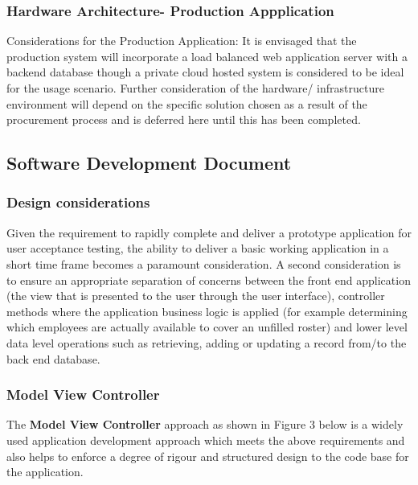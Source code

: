 \documentclass[a4paper,Times New Roman 11pt]{article}
\begin{document}
\subsubsection{Hardware Architecture- Production Appplication}

Considerations for the Production Application: It is envisaged that the production system will incorporate a load balanced web application server with a backend database though a private cloud hosted system is considered to be ideal for the usage scenario. Further consideration of the hardware/ infrastructure environment will depend on the specific solution chosen as a result of the procurement process and is deferred here until this has been completed.

\subsection {Software Development Document}
\subsubsection{Design considerations}
Given the requirement to rapidly complete and deliver a prototype application for user acceptance testing, the ability to deliver a basic working application in a short time frame becomes a paramount consideration. A second consideration is to ensure an appropriate separation of concerns between the front end application (the view that is presented to the user through the user interface), controller methods where the application business logic is applied (for example determining which employees are actually available to cover an unfilled roster) and lower level data level operations such as retrieving, adding or updating a record from/to the back end database.
\subsubsection{Model View Controller}

The \textbf{Model View Controller} approach as shown in Figure 3 below is a widely used application development approach which meets the above requirements and also helps to enforce a degree of rigour and structured design to the code base for the application.
\end{document}
